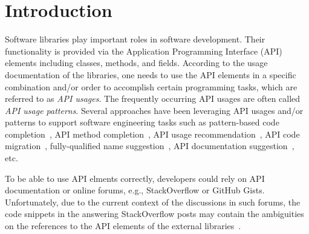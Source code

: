\section{Introduction}
\label{sec:intro}

Software libraries play important roles in software
development. Their functionality is provided via the Application
Programming Interface (API) elements including classes, methods, and
fields. According to the usage documentation of the libraries, one
needs to use the API elements in a specific combination and/or order
to accomplish certain programming tasks, which are referred to as {\em
  API usages}. The frequently occurring API usages are often called
{\em API usage patterns}. Several approaches have been leveraging API
usages and/or patterns to support software engineering tasks such as
pattern-based code completion~\cite{icse12}, API method
completion~\cite{fse16}, API usage recommendation~\cite{icsme18}, API
code migration~\cite{ase14}, fully-qualified name
suggestion~\cite{icse18}, API documentation
suggestion~\cite{liveapi14}, etc.

To be able to use API elments correctly, developers could rely on API
documentation or online forums, e.g., StackOverflow or GitHub
Gists. Unfortunately, due to the current context of the discussions in
such forums, the code snippets in the answering StackOverflow posts
may contain the ambiguities on the references to the API elements of
the external libraries~\cite{liveapi14}.

